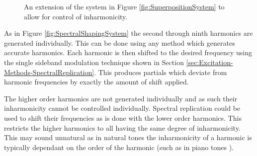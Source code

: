 \begin{figure}[h!]
			\caption{An extension of the system in Figure \ref{fig:SuperpositionSystem} to allow for control
			         of inharmonicity.}
			\label{fig:InharmonicitySystem}
		\end{figure}

		As in Figure \ref{fig:SpectralShapingSystem} the second through ninth harmonics are generated individually.
		This can be done using any method which generates accurate harmonics. Each harmonic is then shifted to the
		desired frequency using the single sideband modulation technique shown in Section 
		\ref{sec:Excitation-Methods-SpectralReplication}. This produces partials which deviate from harmonic
		frequencies by exactly the amount of shift applied.

		The higher order harmonics are not generated individually and as such their inharmonicity cannot be
		controlled individually. Spectral replication could be used to shift their frequencies as is done with the
		lower order harmonics. This restricts the higher harmonics to all having the same degree of inharmonicity.
		This may sound unnatural as in natural tones the inharmonicity of a harmonic is typically dependant on the
		order of the harmonic (such as in piano tones \citep{young1952inharmonicity}).

